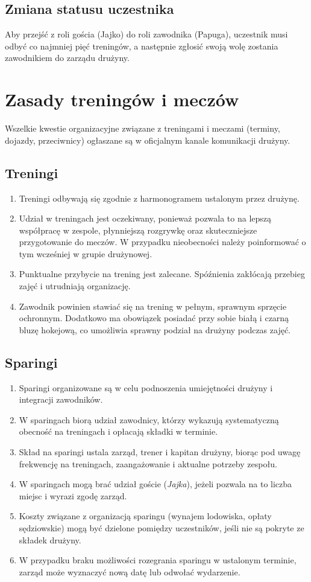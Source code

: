 \documentclass[12pt,a4paper]{article}
\let\stdsection\section
\renewcommand\section{\clearpage\stdsection}
\begin{document}
\subsection{Zmiana statusu uczestnika}
Aby przejść z roli gościa (Jajko) do roli zawodnika (Papuga), uczestnik musi odbyć co najmniej pięć treningów, a następnie zgłosić swoją wolę zostania zawodnikiem do zarządu drużyny.

\section{Zasady treningów i meczów}
Wszelkie kwestie organizacyjne związane z treningami i meczami (terminy, dojazdy, przeciwnicy) ogłaszane są w oficjalnym kanale komunikacji drużyny.

\subsection{Treningi}
\begin{enumerate}
  \item Treningi odbywają się zgodnie z harmonogramem ustalonym przez drużynę.
  \item Udział w treningach jest oczekiwany, ponieważ pozwala to na lepszą współpracę w zespole, płynniejszą rozgrywkę oraz skuteczniejsze przygotowanie do meczów. W przypadku nieobecności należy poinformować o tym wcześniej w grupie drużynowej.
  \item Punktualne przybycie na trening jest zalecane. Spóźnienia zakłócają przebieg zajęć i utrudniają organizację.
  \item Zawodnik powinien stawiać się na trening w pełnym, sprawnym sprzęcie ochronnym. Dodatkowo ma obowiązek posiadać przy sobie białą i czarną bluzę hokejową, co umożliwia sprawny podział na drużyny podczas zajęć.

\end{enumerate}

\subsection{Sparingi}
\begin{enumerate}
  \item Sparingi organizowane są w celu podnoszenia umiejętności drużyny i integracji zawodników.
  \item W sparingach biorą udział zawodnicy, którzy wykazują systematyczną obecność na treningach i opłacają składki w terminie.
  \item Skład na sparingi ustala zarząd, trener i kapitan drużyny, biorąc pod uwagę frekwencję na treningach, zaangażowanie i aktualne potrzeby zespołu.
  \item W sparingach mogą brać udział goście (\textit{Jajka}), jeżeli pozwala na to liczba miejsc i wyrazi zgodę zarząd.
  \item Koszty związane z organizacją sparingu (wynajem lodowiska, opłaty sędziowskie) mogą być dzielone pomiędzy uczestników, jeśli nie są pokryte ze składek drużyny.
  \item W przypadku braku możliwości rozegrania sparingu w ustalonym terminie, zarząd może wyznaczyć nową datę lub odwołać wydarzenie.
\end{enumerate}
\end{document}
